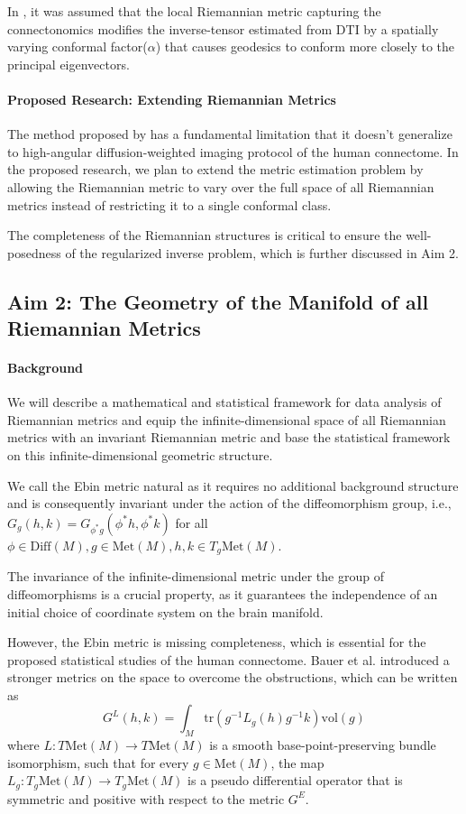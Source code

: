 \documentclass{article}
\theoremstyle{definition}
\theoremstyle{plain}
\begin{document}
In \cite{hao}, it was assumed that the local Riemannian metric capturing the connectonomics modifies the inverse-tensor estimated from DTI by a spatially varying conformal factor($\alpha$) that causes geodesics to conform more closely to the principal eigenvectors.

\paragraph{Proposed Research: Extending Riemannian Metrics}The method proposed by \cite{hao} has a fundamental limitation that it doesn't generalize to high-angular diffusion-weighted imaging protocol of the human connectome. In the proposed research, we plan to extend the metric estimation problem by allowing the Riemannian metric to vary over the full space of all Riemannian metrics instead of restricting it to a single conformal class.

The completeness of the Riemannian structures is critical to ensure the well-posedness of the regularized inverse problem, which is further discussed in Aim 2.

\subsection{Aim 2: The Geometry of the Manifold of all Riemannian Metrics}
\paragraph{Background} We will describe a mathematical and statistical framework for data analysis of Riemannian metrics and equip the infinite-dimensional space of all Riemannian metrics with an invariant Riemannian metric and base the statistical framework on this infinite-dimensional geometric structure.

We call the Ebin metric natural as it requires no additional background structure and is consequently invariant under the action of the diffeomorphism group, i.e., $G_g(h,k)=G_{\phi^*g}(\phi^*h,\phi^*k)$ for all $\phi\in\mathrm{Diff}(M),g\in\mathrm{Met}(M),h,k\in T_g\mathrm{Met}(M)$.

The invariance of the infinite-dimensional metric under the group of diffeomorphisms is a crucial property, as it guarantees the independence of an initial choice of coordinate system on the brain manifold.

However, the Ebin metric is missing completeness, which is essential for the proposed statistical studies of the human connectome. Bauer et al. introduced a stronger metrics on the space to overcome the obstructions, which can be written as
\begin{equation*}
    G^L(h,k)=\int_M\mathrm{tr}(g^{-1}L_g(h)g^{-1}k)\mathrm{vol}(g)
\end{equation*}
where $L:T\mathrm{Met}(M)\rightarrow T\mathrm{Met}(M)$ is a smooth base-point-preserving bundle isomorphism, such that for every $g\in \mathrm{Met}(M)$, the map $L_g:T_g\mathrm{Met}(M)\rightarrow T_g\mathrm{Met}(M)$ is a pseudo differential operator that is symmetric and positive with respect to the metric $G^E$. 
\end{document}
